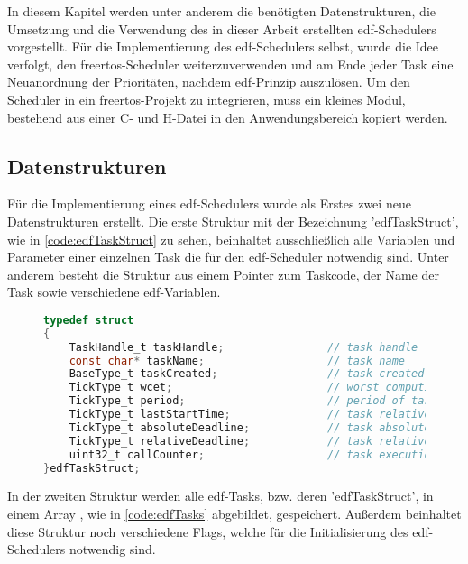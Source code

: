 \documentclass[../EDF Master Thesis.tex]{subfiles}
\begin{document}
In diesem Kapitel werden unter anderem die benötigten Datenstrukturen, die Umsetzung und die Verwendung des in dieser Arbeit erstellten \ac{edf}-Schedulers vorgestellt.
Für die Implementierung des \ac{edf}-Schedulers selbst, wurde die Idee verfolgt, den \ac{freertos}-Scheduler weiterzuverwenden und am Ende jeder Task eine Neuanordnung der Prioritäten, nachdem \ac{edf}-Prinzip auszulösen.
Um den Scheduler in ein \ac{freertos}-Projekt zu integrieren, muss ein kleines Modul, bestehend aus einer C- und H-Datei in den Anwendungsbereich kopiert werden.

\subsection{Datenstrukturen} \label{section:datenstruktur}
Für die Implementierung eines \ac{edf}-Schedulers wurde als Erstes zwei neue Datenstrukturen erstellt.
Die erste Struktur mit der Bezeichnung 'edfTaskStruct', wie in \autoref{code:edfTaskStruct} zu sehen, beinhaltet ausschließlich alle Variablen und Parameter einer einzelnen Task die für den \ac{edf}-Scheduler notwendig sind.
Unter anderem besteht die Struktur aus einem Pointer zum Taskcode, der Name der Task sowie verschiedene \ac{edf}-Variablen.

\begin{figure}[H]
\begin{lstlisting}[language=C, caption=edfTaskStruct Struktur, label=code:edfTaskStruct]
typedef struct
{
    TaskHandle_t taskHandle;                // task handle
    const char* taskName;                   // task name
    BaseType_t taskCreated;                 // task created flag
    TickType_t wcet;                        // worst compution execution time
    TickType_t period;                      // period of task
    TickType_t lastStartTime;               // task relative deadline
    TickType_t absoluteDeadline;            // task absolute deadline
    TickType_t relativeDeadline;            // task relative deadline
    uint32_t callCounter;                   // task execution counter
}edfTaskStruct;
\end{lstlisting}
\end{figure}

\clearpage

In der zweiten Struktur werden alle \ac{edf}-Tasks, bzw. deren 'edfTaskStruct', in einem Array , wie in \autoref{code:edfTasks} abgebildet, gespeichert.
Außerdem beinhaltet diese Struktur noch verschiedene Flags, welche für die Initialisierung des \ac{edf}-Schedulers notwendig sind.
\end{document}
